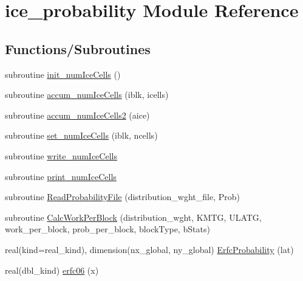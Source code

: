 \hypertarget{namespaceice__probability}{
\section{ice\_\-probability Module Reference}
\label{namespaceice__probability}
}
\subsection*{Functions/Subroutines}
\begin{DoxyCompactItemize}
\item 
subroutine \hyperlink{namespaceice__probability_a4df379181c71e4ceeb1ef127de0dace0}{init\_\-numIceCells} ()
\item 
subroutine \hyperlink{namespaceice__probability_af4690e52bcf824f65d95ef537d2820b2}{accum\_\-numIceCells} (iblk, icells)
\item 
subroutine \hyperlink{namespaceice__probability_ab54f919c558a646e53b7587961da2c48}{accum\_\-numIceCells2} (aice)
\item 
subroutine \hyperlink{namespaceice__probability_af08e27cf4323fd5da1b0920c8e9b6532}{set\_\-numIceCells} (iblk, ncells)
\item 
subroutine \hyperlink{namespaceice__probability_ad845a3b0d89f3988e7360443aaade9c8}{write\_\-numIceCells}
\item 
subroutine \hyperlink{namespaceice__probability_aecdab917ec3ada7a8242d8fd3a57aa8c}{print\_\-numIceCells}
\item 
subroutine \hyperlink{namespaceice__probability_aae3f520676ae6acd850363f60f637c3f}{ReadProbabilityFile} (distribution\_\-wght\_\-file, Prob)
\item 
subroutine \hyperlink{namespaceice__probability_ab5d1ecab27a5c7e3ba4a1fc39af3adcc}{CalcWorkPerBlock} (distribution\_\-wght, KMTG, ULATG, work\_\-per\_\-block, prob\_\-per\_\-block, blockType, bStats)
\item 
real(kind=real\_\-kind), dimension(nx\_\-global, ny\_\-global) \hyperlink{namespaceice__probability_a46608f3ec8b2296b8d5fac3dc7822255}{ErfcProbability} (lat)
\item 
real(dbl\_\-kind) \hyperlink{namespaceice__probability_af2adb80d8ffb5383c91ab49ece3f2832}{erfc06} (x)
\end{DoxyCompactItemize}
